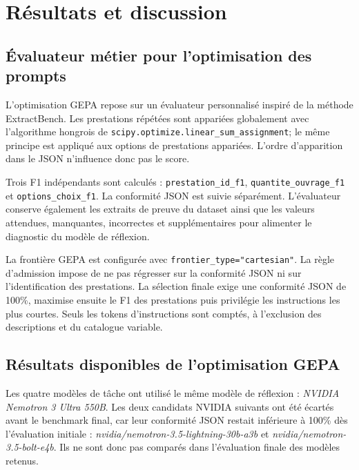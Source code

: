 \section{Résultats et discussion}
\subsection{Évaluateur métier pour l'optimisation des prompts}
L'optimisation GEPA repose sur un évaluateur personnalisé inspiré de la méthode ExtractBench. Les prestations répétées sont appariées globalement avec l'algorithme hongrois de \texttt{scipy.optimize.linear\_sum\_assignment}; le même principe est appliqué aux options de prestations appariées. L'ordre d'apparition dans le JSON n'influence donc pas le score.

Trois F1 indépendants sont calculés : \texttt{prestation\_id\_f1}, \texttt{quantite\_ouvrage\_f1} et \texttt{options\_choix\_f1}. La conformité JSON est suivie séparément. L'évaluateur conserve également les extraits de preuve du dataset ainsi que les valeurs attendues, manquantes, incorrectes et supplémentaires pour alimenter le diagnostic du modèle de réflexion.

La frontière GEPA est configurée avec \texttt{frontier\_type="cartesian"}. La règle d'admission impose de ne pas régresser sur la conformité JSON ni sur l'identification des prestations. La sélection finale exige une conformité JSON de 100\%, maximise ensuite le F1 des prestations puis privilégie les instructions les plus courtes. Seuls les tokens d'instructions sont comptés, à l'exclusion des descriptions et du catalogue variable.

\subsection{Résultats disponibles de l'optimisation GEPA}
Les quatre modèles de tâche ont utilisé le même modèle de réflexion : \textit{NVIDIA Nemotron 3 Ultra 550B}. Les deux candidats NVIDIA suivants ont été écartés avant le benchmark final, car leur conformité JSON restait inférieure à 100\% dès l'évaluation initiale : \textit{nvidia/nemotron-3.5-lightning-30b-a3b} et \textit{nvidia/nemotron-3.5-bolt-e4b}. Ils ne sont donc pas comparés dans l'évaluation finale des modèles retenus.

